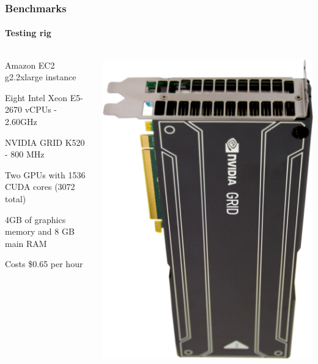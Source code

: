 \documentclass[handout, notes=hide]{beamer}
\begin{document}

\begin{frame}
\frametitle{Benchmarks}
\framesubtitle{Testing rig}
\setlength{\parskip}{0.5em}

\begin{columns}[T]
\begin{column}[T]{0.7\textwidth}
\setlength{\parskip}{0.5em}

Amazon EC2 g2.2xlarge instance

Eight Intel Xeon E5-2670 vCPUs - 2.60GHz

NVIDIA GRID K520 - 800 MHz

Two GPUs with 1536 CUDA cores (3072 total)

4GB of graphics memory and 8 GB main RAM

Costs \$0.65 per hour

\end{column}
\begin{column}[T]{0.3\textwidth}
\vspace{0.0em}
\includegraphics[width=1.0\textwidth]{k520}
\end{column}
\end{columns}

\end{frame}
\end{document}
